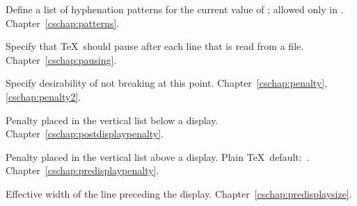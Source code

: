\begin{glossinventory}
\item [\cs{patterns\gr{general text}}]
      Define a list of hyphenation patterns for the current
      value of ;  allowed only in \IniTeX.
Chapter~\ref{cschap:patterns}.

\item [\cs{pausing}]
      Specify that \TeX\ should pause after each line that is 
      read from a file.
Chapter~\ref{cschap:pausing}.

\item [\cs{penalty}]
      Specify desirability of not breaking at this point.
Chapter~\ref{cschap:penalty},\ref{cschap:penalty2}.

\item [\cs{postdisplaypenalty}]
      Penalty placed in the vertical list below a display.
Chapter~\ref{cschap:postdisplaypenalty}.

\item [\cs{predisplaypenalty}]
      Penalty placed in the vertical list above a display.
      Plain \TeX\ default:~.
Chapter~\ref{cschap:predisplaypenalty}.

\item [\cs{predisplaysize}]
      Effective width of the line preceding the display.
Chapter~\ref{cschap:predisplaysize}.


\end{glossinventory}
